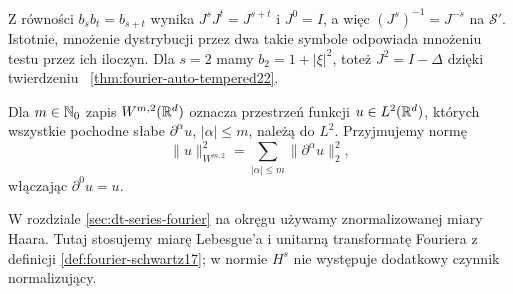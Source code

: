 Z równości $b_sb_t=b_{s+t}$ wynika
$J^sJ^t=J^{s+t}$ i $J^0=I$, a więc
$(J^s)^{-1}=J^{-s}$ na $\mathcal S'$.
Istotnie, mnożenie dystrybucji przez dwa takie
symbole odpowiada mnożeniu testu przez ich iloczyn.
Dla $s=2$ mamy $b_2=1+|\xi|^2$, toteż
$J^2=I-\Delta$ dzięki twierdzeniu
~\ref{thm:fourier-auto-tempered22}.

Dla $m\in\mathbb N_0$ zapis $W^{m,2}(\mathbb R^d)$ oznacza
przestrzeń funkcji $u\in L^2(\mathbb R^d)$, których
wszystkie pochodne słabe $\partial^\alpha u$,
$|\alpha|\le m$, należą do $L^2$.
Przyjmujemy normę
\[
 \|u\|_{W^{m,2}}^2=\sum_{|\alpha|\le m}
 \|\partial^\alpha u\|_2^2,
\]
włączając $\partial^0u=u$.

\begin{uwaga}
W rozdziale \ref{sec:dt-series-fourier} na okręgu używamy
znormalizowanej miary Haara. Tutaj stosujemy miarę
Lebesgue'a i unitarną transformatę Fouriera z definicji
\ref{def:fourier-schwartz17}; w normie $H^s$ nie występuje
dodatkowy czynnik normalizujący.
\end{uwaga}

